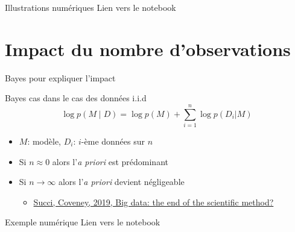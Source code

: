 \documentclass[presentation, aspectratio=169]{beamer}
\begin{document}
\begin{frame}{Illustrations numériques}
  Lien vers le notebook
\end{frame}


\section{Impact du nombre d'observations}

\begin{frame}{Bayes pour expliquer l'impact}
  \begin{block}{Bayes cas dans le cas des données i.i.d}
    \begin{equation*}
      \log p(M\mid D) = \log p(M) + \sum_{i=1}^n \log p(D_i|M)
    \end{equation*}
    \begin{itemize}
    \item $M$: modèle, $D_i$: $i$-ème données sur $n$
    \item Si $n\approx 0$ alors l'\textit{a priori} est prédominant
    \item Si $n\to\infty$ alors l'\textit{a priori} devient
      négligeable
      \begin{itemize}
      \item \href{https://doi.org/10.1098/rsta.2018.0145}{Succi, Coveney, 2019, Big data: the end of the scientific method?}
      \end{itemize}
    \end{itemize}
  \end{block}
\end{frame}


\begin{frame}{Exemple numérique}
  Lien vers le notebook
\end{frame}
\end{document}
